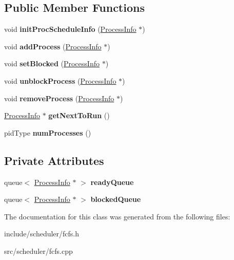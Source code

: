 \subsection*{\-Public \-Member \-Functions}
\begin{DoxyCompactItemize}
\item 
\hypertarget{classcFCFS_aff34f18c6f4c3f38029d904cd2ec55de}{void {\bfseries init\-Proc\-Schedule\-Info} (\hyperlink{structProcessInfo}{\-Process\-Info} $\ast$)}\label{d6/dc3/classcFCFS_aff34f18c6f4c3f38029d904cd2ec55de}

\item 
\hypertarget{classcFCFS_a25d4bf440041f5294f3b9c5aff20b411}{void {\bfseries add\-Process} (\hyperlink{structProcessInfo}{\-Process\-Info} $\ast$)}\label{d6/dc3/classcFCFS_a25d4bf440041f5294f3b9c5aff20b411}

\item 
\hypertarget{classcFCFS_a1b8ee3a759a31032ec7c1cd7b15ed5df}{void {\bfseries set\-Blocked} (\hyperlink{structProcessInfo}{\-Process\-Info} $\ast$)}\label{d6/dc3/classcFCFS_a1b8ee3a759a31032ec7c1cd7b15ed5df}

\item 
\hypertarget{classcFCFS_a793da0298f9b36ab8505a0e3daaf41ec}{void {\bfseries unblock\-Process} (\hyperlink{structProcessInfo}{\-Process\-Info} $\ast$)}\label{d6/dc3/classcFCFS_a793da0298f9b36ab8505a0e3daaf41ec}

\item 
\hypertarget{classcFCFS_aeeac757885108ae510b728600ebba248}{void {\bfseries remove\-Process} (\hyperlink{structProcessInfo}{\-Process\-Info} $\ast$)}\label{d6/dc3/classcFCFS_aeeac757885108ae510b728600ebba248}

\item 
\hypertarget{classcFCFS_aa2b92a8a992078e499aab455c9d78faf}{\hyperlink{structProcessInfo}{\-Process\-Info} $\ast$ {\bfseries get\-Next\-To\-Run} ()}\label{d6/dc3/classcFCFS_aa2b92a8a992078e499aab455c9d78faf}

\item 
\hypertarget{classcFCFS_a0a72de791436a84120a534dd2fa0485d}{pid\-Type {\bfseries num\-Processes} ()}\label{d6/dc3/classcFCFS_a0a72de791436a84120a534dd2fa0485d}

\end{DoxyCompactItemize}
\subsection*{\-Private \-Attributes}
\begin{DoxyCompactItemize}
\item 
\hypertarget{classcFCFS_afebe08e2ae6dc564b5aad24e3b30f842}{queue$<$ \hyperlink{structProcessInfo}{\-Process\-Info} $\ast$ $>$ {\bfseries ready\-Queue}}\label{d6/dc3/classcFCFS_afebe08e2ae6dc564b5aad24e3b30f842}

\item 
\hypertarget{classcFCFS_af61586b3ed208ebd0e12bc495c31b56c}{queue$<$ \hyperlink{structProcessInfo}{\-Process\-Info} $\ast$ $>$ {\bfseries blocked\-Queue}}\label{d6/dc3/classcFCFS_af61586b3ed208ebd0e12bc495c31b56c}

\end{DoxyCompactItemize}


\-The documentation for this class was generated from the following files\-:\begin{DoxyCompactItemize}
\item 
include/scheduler/fcfs.\-h\item 
src/scheduler/fcfs.\-cpp\end{DoxyCompactItemize}
